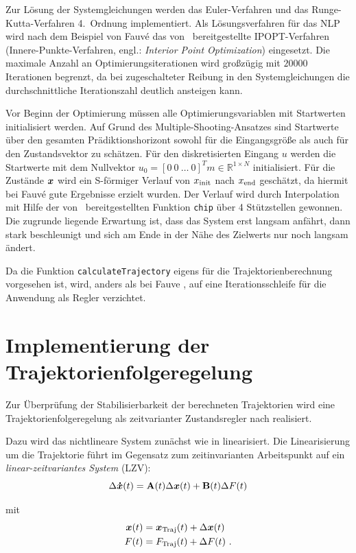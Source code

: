 Zur Lösung der Systemgleichungen werden das Euler-Verfahren und das Runge-Kutta-Verfahren 4.~Ordnung implementiert. Als Lösungsverfahren für das NLP wird nach dem Beispiel von Fauvé \cite{fauve} das von \casadi\ bereitgestellte IPOPT-Verfahren (Innere-Punkte-Verfahren, engl.: \textit{Interior Point Optimization}) eingesetzt. Die maximale Anzahl an Optimierungsiterationen wird großzügig mit $20000$ Iterationen begrenzt, da bei zugeschalteter Reibung in den Systemgleichungen die durchschnittliche Iterationszahl deutlich ansteigen kann.

Vor Beginn der Optimierung müssen alle Optimierungsvariablen mit Startwerten initialisiert werden. Auf Grund des Multiple-Shooting-Ansatzes sind Startwerte über den gesamten Prädiktionshorizont sowohl für die Eingangsgröße als auch für den Zustandsvektor zu schätzen. Für den diskretisierten Eingang $u$ werden die Startwerte mit dem Nullvektor $u_0 = [0 \ 0 \ \ldots \ 0 ]^Tm\in \mathbb{R}^{1 \times N}$ initialisiert. Für die Zustände $\boldsymbol{x}$ wird ein S-förmiger Verlauf von $x_{\mathrm{init}}$ nach $x_{\mathrm{end}}$ geschätzt, da hiermit bei Fauvé \cite{fauve} gute Ergebnisse erzielt wurden. Der Verlauf wird durch Interpolation mit Hilfe der von \Matlab\ bereitgestellten Funktion \texttt{chip} über 4  Stützstellen gewonnen. Die zugrunde liegende Erwartung ist, dass das System erst langsam anfährt, dann stark beschleunigt und sich am Ende in der Nähe des Zielwerts nur noch langsam ändert.

Da die Funktion \texttt{calculateTrajectory} eigens für die Trajektorienberechnung vorgesehen ist, wird, anders als bei Fauve \cite{fauve}, auf eine Iterationsschleife für die Anwendung als Regler verzichtet.


\section{Implementierung der Trajektorienfolgeregelung}\label{sec:tfr}

Zur Überprüfung der Stabilisierbarkeit der berechneten Trajektorien wird eine Trajektorienfolgeregelung als zeitvarianter Zustandsregler nach \cite{matPrakt2} realisiert. 

Dazu wird das nichtlineare System zunächst wie in  linearisiert. Die Linearisierung um die Trajektorie führt im Gegensatz zum zeitinvarianten Arbeitspunkt auf ein \emph{linear-zeitvariantes System} (LZV):
	\[
	\Delta \boldsymbol{\dot{x}}(t) = {\boldsymbol{\mathrm{A}}}(t) \Delta \boldsymbol{x}(t) + {\boldsymbol{\mathrm{B}}}(t) \Delta F(t)
\]

mit 
\begin{align*}
	\boldsymbol{x}(t) &= \boldsymbol{x}_{\mathrm{Traj}}(t) + \Delta \boldsymbol{x}(t) \\
	 F(t) &= F_{\mathrm{Traj}}(t) + \Delta F(t) \ .
\end{align*}

